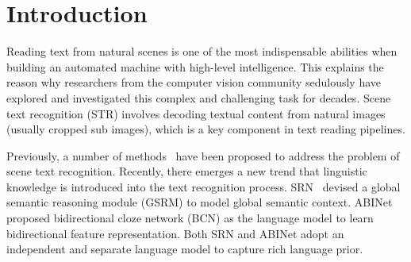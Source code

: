 \documentclass[runningheads]{llncs}
\begin{document}
\section{Introduction}  \label{sec:intro}
Reading text from natural scenes is one of the most indispensable abilities when building an automated machine with high-level intelligence. This explains the reason why researchers from the computer vision community sedulously have explored and investigated this complex and challenging task for decades. Scene text recognition (STR) involves decoding textual content from natural images (usually cropped sub images), which is a key component in text reading pipelines.

Previously, a number of methods~\cite{CRNN,Focusing,ASTER,MASTER} have been proposed to address the problem of scene text recognition. Recently, there emerges a new trend that linguistic knowledge is introduced into the text recognition process. SRN~\cite{SRN} devised a global semantic reasoning module (GSRM) to model global semantic context. ABINet~\cite{ABInet} proposed bidirectional cloze network (BCN) as the language model to learn bidirectional feature representation. Both SRN and ABINet adopt an independent and separate language model to capture rich language prior. 
\end{document}
